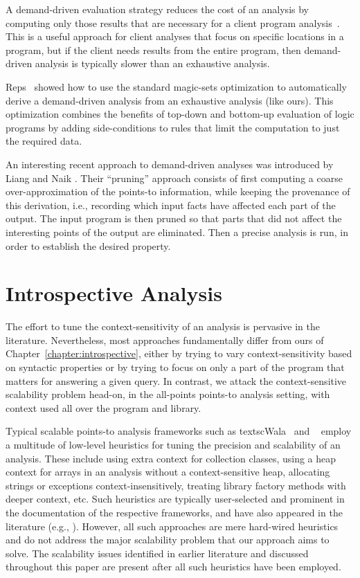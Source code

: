 A demand-driven evaluation strategy reduces the cost of an analysis by computing only those results that are necessary for a client program analysis~\cite{oopsla:2005:Sridharan,pldi:2006:Sridharan,popl:2008:Zheng,pldi:2001:Heintze}. This is a useful approach for client analyses that focus on specific locations in a program, but if the client needs results from the entire program, then demand-driven analysis is typically slower than an exhaustive analysis.

Reps~\cite{cc:1994:Reps} showed how to use the standard magic-sets optimization to automatically derive a demand-driven analysis from an exhaustive analysis (like ours). This optimization combines the benefits of top-down and bottom-up evaluation of logic programs by adding side-conditions to rules that limit the computation to just the required data.

An interesting recent approach to demand-driven analyses was introduced by Liang and Naik \cite{pldi:2011:Liang}. Their ``pruning'' approach consists of first computing a coarse over-approximation of the points-to information, while keeping the provenance of this derivation, i.e., recording which input facts have affected each part of the output. The input program is then pruned so that parts that did not affect the interesting points of the output are eliminated. Then a precise analysis is run, in order to establish the desired property.



\section{Introspective Analysis}
\label{sec:related:introspective}

The effort to tune the context-sensitivity of an analysis is pervasive in the literature. Nevertheless, most approaches fundamentally differ from ours of Chapter~\ref{chapter:introspective}, either by trying to vary context-sensitivity based on syntactic properties or by trying to focus on only a part of the program that matters for answering a given query. In contrast, we attack the context-sensitive scalability problem  head-on, in the all-points points-to analysis setting, with context used all over the program and library.

Typical scalable points-to analysis frameworks such as textsc{Wala}~\cite{www:wala} and \doop{}~\cite{oopsla:2009:Bravenboer} employ a multitude of low-level heuristics for tuning the precision and scalability of an analysis. These include using extra context for collection classes, using a heap context for arrays in an analysis without a context-sensitive heap, allocating strings or exceptions context-insensitively, treating library factory methods with deeper context, etc. Such heuristics are typically user-selected and prominent in the documentation of the respective frameworks, and have also appeared in the literature (e.g., \cite{pldi:2009:Tripp,cc:2013:Kastrinis}). However, all such approaches are mere hard-wired heuristics and do not address the major scalability problem that our approach aims to solve. The scalability issues identified in earlier literature and discussed throughout this paper are present after all such heuristics have been employed.

